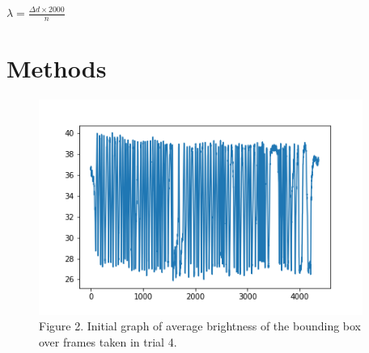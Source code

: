 \documentclass{article}
\begin{document}
\begin{center}
    $\lambda = \frac{\Delta d \times 2000}{n}$
\end{center}

\section*{Methods}

\begin{figure}[!ht]
\begingroup
    \rightskip
    \leftskip
    \begin{center}
        \includegraphics[width=300pt,height=200pt]{4_raw.png}
        \caption*{Figure 2. Initial graph of average brightness of the bounding box over frames taken in trial 4.}
    \end{center}
\endgroup
\end{figure}
\end{document}
